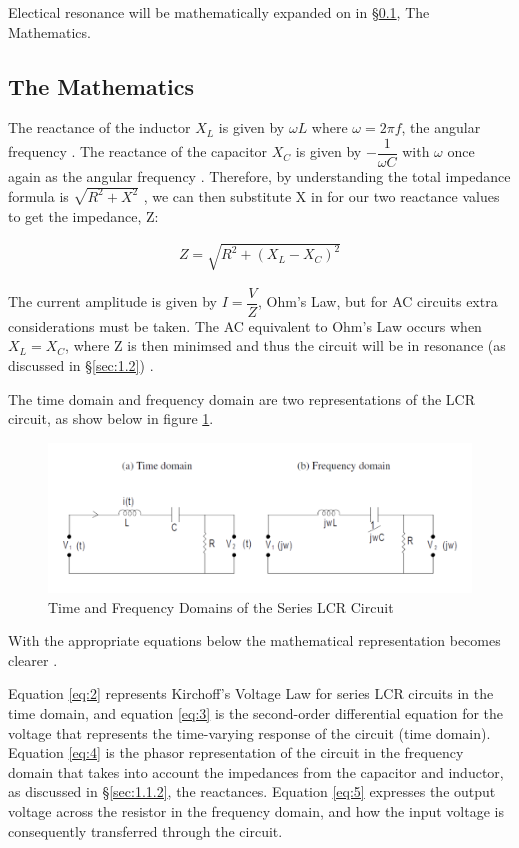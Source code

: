 \documentclass[12pt]{article}
\begin{document}
Electical resonance will be mathematically expanded on in §\ref{sec:1.3}, The Mathematics.

\subsection{The Mathematics}\label{sec:1.3}

The reactance of the inductor $X_L$ is given by $\omega L$ where $\omega = 2 \pi f$, the angular frequency
\cite{UCDlcr,isaacimpedance}.
The reactance of the capacitor $X_C$ is given by $- \dfrac{1}{\omega C}$ with $\omega$ once again as the angular frequency
\cite{UCDlcr,isaacimpedance}.
Therefore, by understanding the total impedance formula is $\sqrt{R^2 + X^2}$
\cite{isaacimpedance},
we can then substitute X in for our two reactance values to get the impedance, Z:

\begin{gather} \label{eq:1}
    Z = \sqrt{R^2 + (X_L - X_C)^2}
\end{gather}

The current amplitude is given by $I = \dfrac{V}{Z}$, Ohm's Law, but for AC circuits extra considerations must be taken.
The AC equivalent to Ohm's Law occurs when $X_L = X_C$, where Z is then minimsed and thus the circuit will be in resonance (as discussed in §\ref{sec:1.2})
\cite{UCDlcr}.

The time domain and frequency domain are two representations of the LCR circuit, as show below in figure \ref{fig:timefreq}.

\begin{figure} [H]
    \centering
    \includegraphics[width=\textwidth]{time and freq domains.png}
    \caption{\centering \footnotesize{Time and Frequency Domains of the Series LCR Circuit \protect\cite{UCDlcr}}}
    \label{fig:timefreq}
\end{figure}

With the appropriate equations below the mathematical representation becomes clearer
\cite{UCDlcr}.

Equation \ref{eq:2} represents Kirchoff's Voltage Law for series LCR circuits in the time domain, and equation \ref{eq:3} is the second-order differential equation
for the voltage that represents the time-varying response of the circuit (time domain).
Equation \ref{eq:4} is the phasor representation of the circuit in the frequency domain that takes into account the impedances from the capacitor and inductor,
as discussed in §\ref{sec:1.1.2}, the reactances. Equation \ref{eq:5} expresses the output voltage across the resistor in the frequency domain, and how the input voltage is
consequently transferred through the circuit.
\end{document}
